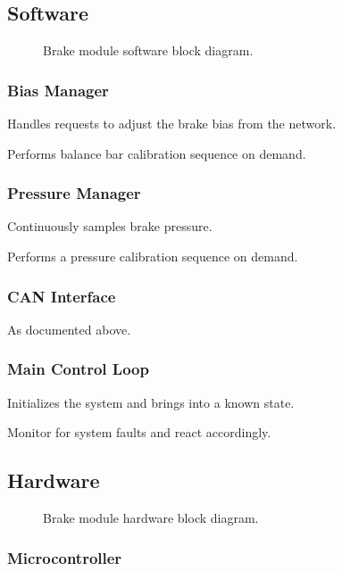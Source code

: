 \subsection{Software}

\begin{figure}
\centering

\caption{Brake module software block diagram.}
\label{fig:pneumatics_design}
\end{figure}


\subsubsection{Bias Manager}

Handles requests to adjust the brake bias from the network. 

Performs balance bar calibration sequence on demand.


\subsubsection{Pressure Manager}

Continuously samples brake pressure.

Performs a pressure calibration sequence on demand.


\subsubsection{CAN Interface}

As documented above.


\subsubsection{Main Control Loop}

Initializes the system and brings into a known state.

Monitor for system faults and react accordingly.


\subsection{Hardware}

\begin{figure}
\centering

\caption{Brake module hardware block diagram.}
\label{fig:pneumatics_design}
\end{figure}


\subsubsection{Microcontroller}

